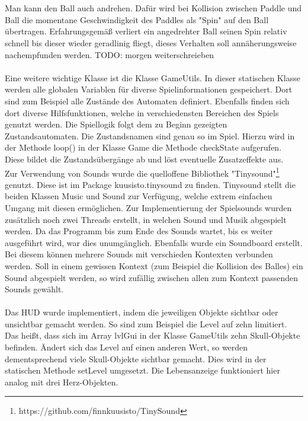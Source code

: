 \\\\
Man kann den Ball auch andrehen. Dafür wird bei Kollision zwischen Paddle und Ball die momentane Geschwindigkeit des Paddles als "Spin" auf den Ball übertragen. Erfahrungsgemäß verliert ein angedrehter Ball seinen Spin relativ schnell bis dieser wieder geradlinig fliegt, dieses Verhalten soll annäherungsweise nachempfunden werden.
TODO: morgen weiterschreieben
\\\\

Eine weitere wichtige Klasse ist die Klasse GameUtils. In dieser statischen Klasse werden alle globalen Variablen für diverse Spielinformationen gespeichert. Dort sind zum Beispiel alle Zustände des Automaten definiert. Ebenfalls finden sich dort diverse Hilfsfunktionen, welche in verschiedensten Bereichen des Spiels genutzt werden. Die Spiellogik folgt dem zu Beginn gezeigten Zustandsautomaten. Die Zustandsnamen sind genau so im Spiel. Hierzu wird in der Methode loop() in der Klasse Game die Methode checkState aufgerufen. Diese bildet die Zustandsübergänge ab und löst eventuelle Zusatzeffekte aus.\\
Zur Verwendung von Sounds wurde die quelloffene Bibliothek "Tinysound"\footnote{https://github.com/finnkuusisto/TinySound} genutzt. Diese ist im Package kuusisto.tinysound zu finden. Tinysound stellt die beiden Klassen Music und Sound zur Verfügung, welche extrem einfachen Umgang mit diesen ermöglichen. Zur Implementierung der Spielsounds wurden zusätzlich noch zwei Threads erstellt, in welchen Sound und Musik abgespielt werden. Da das Programm bis zum Ende des Sounds wartet, bis es weiter ausgeführt wird, war dies unumgänglich. Ebenfalls wurde ein Soundboard erstellt. Bei diesem können mehrere Sounds mit verschieden Kontexten verbunden werden. Soll in einem gewissen Kontext (zum Beispiel die Kollision des Balles) ein Sound abgespielt werden, so wird zufällig zwischen allen zum Kontext passenden Sounds gewählt.\\\\
Das HUD wurde implementiert, indem die jeweiligen Objekte sichtbar oder unsichtbar gemacht werden. So sind zum Beispiel die Level auf zehn limitiert. Das heißt, dass sich im Array lvlGui in der Klasse GameUtils zehn Skull-Objekte befinden. Ändert sich das Level auf einen anderen Wert, so werden dementsprechend viele Skull-Objekte sichtbar gemacht. Dies wird in der statischen Methode setLevel umgesetzt. Die Lebensanzeige funktioniert hier analog mit drei Herz-Objekten.